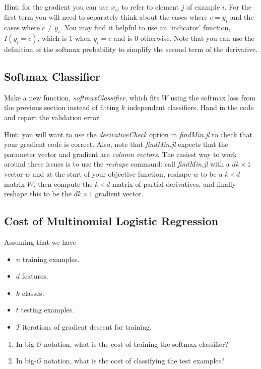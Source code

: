 \documentclass{article}
\def\blu#1{{\color{blu}#1}}
\def\items#1{\begin{itemize}#1\end{itemize}}
\def\enum#1{\begin{enumerate}#1\end{enumerate}}
\begin{document}
Hint: for the gradient you can use $x_{ij}$ to refer to element $j$ of example $i$. For the first term you will need to separately think about the cases where $c=y_i$ and the cases where $c\neq y_i$. You may find it helpful to use an `indicator' function, $I(y_i = c)$, which is $1$ when $y_i = c$ and is $0$ otherwise. Note that you can use the definition of the softmax probability to simplify the second term of the derivative.


\pagebreak

\subsection{Softmax Classifier}

Make a new function, \emph{softmaxClassifier}, which fits $W$ using the softmax loss from the previous section  instead of fitting $k$ independent classifiers. \blu{Hand in the code and report the validation error}.

Hint: you will want to use the \emph{derivativeCheck} option in \emph{findMin.jl} to check that your gradient code is correct. Also, note that \emph{findMin.jl} expects that the parameter vector and gradient are \emph{column vectors}. The easiest way to work around these issues is to use the \emph{reshape} command: call \emph{findMin.jl} with a $dk \times 1$ vector $w$ and at the start of your objective function, reshape $w$ to be a $k \times d$ matrix $W$, then compute the $k \times d$ matrix of partial derivatives, and finally reshape this to be the $dk \times 1$ gradient vector.

\pagebreak

\subsection{Cost of Multinomial Logistic Regression}

Assuming that we have
\items{
\item $n$ training examples.
\item $d$ features.
\item $k$ classes.
\item $t$ testing examples.
\item $T$ iterations of gradient descent for training.
}
\blu{\enum{
\item In big-$\mathcal{O}$ notation, what is the cost of training the softmax classifier?
\item In big-$\mathcal{O}$ notation, what is the cost of classifying the test examples?
}}
\end{document}
